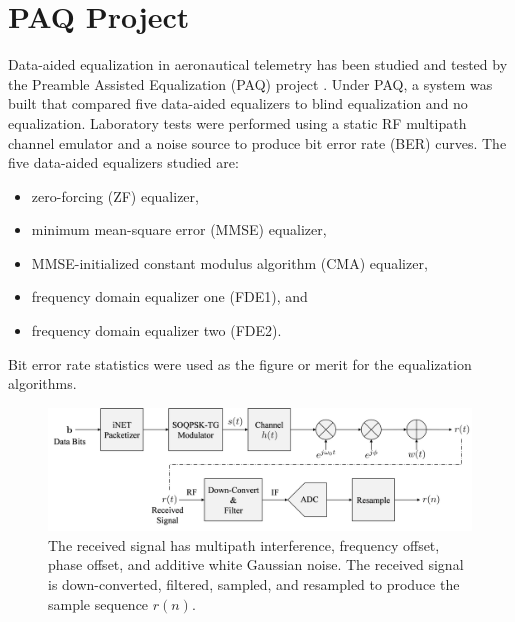 

\chapter{PAQ Project}
\label{chap:PAQ_project}
Data-aided equalization in aeronautical telemetry has been studied and tested by the Preamble Assisted Equalization (PAQ) project \cite{paq-phase1-report:2014}.
Under PAQ, a system was built that compared five data-aided equalizers to blind equalization and no equalization.
Laboratory tests were performed using a static RF multipath channel emulator and a noise source to produce bit error rate (BER) curves.
The five data-aided equalizers studied are:
\begin{itemize}
\item zero-forcing (ZF) equalizer,
\item minimum mean-square error (MMSE) equalizer,
\item MMSE-initialized constant modulus algorithm (CMA) equalizer,
\item frequency domain equalizer one (FDE1), and
\item frequency domain equalizer two (FDE2).
\end{itemize}
Bit error rate statistics were used as the figure or merit for the equalization algorithms.
\begin{figure}
	\centering\includegraphics[width=12.33in/100*50]{figures/intro/received1.pdf}
	\caption{The received signal has multipath interference, frequency offset, phase offset, and additive white Gaussian noise. The received signal is down-converted, filtered, sampled, and resampled to produce the sample sequence $r(n)$.}
	\label{fig:received1}
\end{figure}

